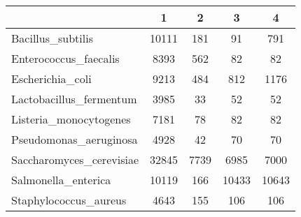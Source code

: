 \begin{tabular}{|l||c|c|c|c|}
\hline
& 1 & 2 & 3 & 4 \\
\hline
\hline
Bacillus\_subtilis & \cellcolor[RGB]{235, 71, 71} 10111 & \cellcolor[RGB]{237, 237, 253} 181 & \cellcolor[RGB]{232, 232, 252} 91 & \cellcolor[RGB]{252, 232, 232} 791 \\
\hline
Enterococcus\_faecalis & \cellcolor[RGB]{235, 71, 71} 8393 & \cellcolor[RGB]{252, 232, 232} 562 & \cellcolor[RGB]{232, 232, 252} 82 & \cellcolor[RGB]{232, 232, 252} 82 \\
\hline
Escherichia\_coli & \cellcolor[RGB]{235, 71, 71} 9213 & \cellcolor[RGB]{223, 223, 251} 484 & \cellcolor[RGB]{246, 246, 254} 812 & \cellcolor[RGB]{253, 241, 241} 1176 \\
\hline
Lactobacillus\_fermentum & \cellcolor[RGB]{235, 71, 71} 3985 & \cellcolor[RGB]{218, 218, 251} 33 & \cellcolor[RGB]{255, 255, 255} 52 & \cellcolor[RGB]{255, 255, 255} 52 \\
\hline
Listeria\_monocytogenes & \cellcolor[RGB]{235, 71, 71} 7181 & \cellcolor[RGB]{218, 218, 251} 78 & \cellcolor[RGB]{255, 255, 255} 82 & \cellcolor[RGB]{255, 255, 255} 82 \\
\hline
Pseudomonas\_aeruginosa & \cellcolor[RGB]{235, 71, 71} 4928 & \cellcolor[RGB]{218, 218, 251} 42 & \cellcolor[RGB]{255, 255, 255} 70 & \cellcolor[RGB]{255, 255, 255} 70 \\
\hline
Saccharomyces\_cerevisiae & \cellcolor[RGB]{235, 71, 71} 32845 & \cellcolor[RGB]{252, 232, 232} 7739 & \cellcolor[RGB]{232, 232, 252} 6985 & \cellcolor[RGB]{232, 232, 252} 7000 \\
\hline
Salmonella\_enterica & \cellcolor[RGB]{255, 255, 255} 10119 & \cellcolor[RGB]{218, 218, 251} 166 & \cellcolor[RGB]{255, 255, 255} 10433 & \cellcolor[RGB]{255, 255, 255} 10643 \\
\hline
Staphylococcus\_aureus & \cellcolor[RGB]{235, 71, 71} 4643 & \cellcolor[RGB]{252, 232, 232} 155 & \cellcolor[RGB]{232, 232, 252} 106 & \cellcolor[RGB]{232, 232, 252} 106 \\
\hline
\end{tabular}
